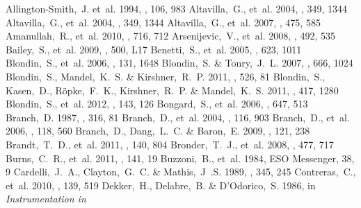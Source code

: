 \documentclass[apj]{emulateapj-rtx4}
\begin{document}
%

\begin{thebibliography}{}


  Allington-Smith,~J. et~al. 1994, \pasp, 106, 983
  Altavilla,~G., et~al. 2004, \mnras, 349, 1344
  Altavilla,~G., et~al. 2004, \mnras, 349, 1344
  Altavilla,~G., et~al. 2007, \aap, 475, 585
 Amanullah,~R.,
  et~al. 2010, \apj, 716, 712
 Arsenijevic,~V.,
  et~al. 2008, \aap, 492, 535
 Bailey,~S., et~al. 2009, \aap,
  500, L17
 Benetti,~S., et~al. 2005,
  \apj, 623, 1011
 Blondin,~S., et~al. 2006,
  \aj, 131, 1648
 Blondin,~S. \& Tonry,~J.~L.
  2007, \apj, 666, 1024
 Blondin,~S.,
  Mandel,~K.~S. \& Kirshner,~R.~P. 2011, \aap, 526, 81 
 Blondin,~S., Kasen,~D.,
  R\"opke,~F.~K., Kirshner,~R.~P. \& Mandel,~K.~S. 2011, \mnras, 417,
  1280
 Blondin,~S., et~al. 2012,
  \aj, 143, 126
 Bongard,~S., et~al. 2006,
  \apj, 647, 513
 Branch,~D. 1987, \apjl, 316, 81
 Branch,~D., et~al. 2004,
  \pasp, 116, 903
 Branch,~D., et~al. 2006,
  \pasp, 118, 560
 Branch,~D., Dang,~L.~C. \&
  Baron,~E. 2009, \pasp, 121, 238 
 Brandt,~T.~D., et~al. 2011,
  \aj, 140, 804
 Bronder,~T.~J., et~al. 2008,
  \aap, 477, 717
 Burns,~C.~R., et~al. 2011, \aj, 
  141, 19
 Buzzoni,~B., et~al. 1984,
  ESO Messenger, 38, 9
  Cardelli,~J.~A., Clayton,~G.~C. \& Mathis,~J~.S. 1989, \apj, 345,
  245 
 Contreras,~C.,
  et~al. 2010, \aj, 139, 519
 Dekker,~H.,
  Delabre,~B. \& D'Odorico,~S. 1986, in {\em Instrumentation in
}
\end{thebibliography}
\end{document}
